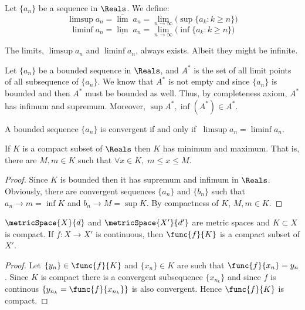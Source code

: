 Let \(\{a_n\}\) be a sequence in \(\Reals\). We define:
\[ \limsup a_n = \overline{\lim} \; a_n = \lim_{n \to \infty}{\Big(\sup{\{a_k : k\geq n\}}\Big)}\]
\[ \liminf a_n = \underline{\lim} \; a_n = \lim_{n \to \infty}{\Big(\inf{\{a_k : k\geq n\}}\Big)}\]

\begin{note}
    The limits, \(\limsup a_n \) and \(\liminf a_n\), always exists. Albeit they might be infinite.
\end{note}

Let \(\{a_n\}\) be a bounded sequence in \(\Reals\), and \(A^*\) is the set of all limit points of all subsequence of  \(\{a_n\}\). We know that \(A^*\) is not empty and since  \(\{a_n\}\) is bounded and then \(A^*\) must be bounded as well. Thus, by completeness axiom, \(A^*\) has infimum and supremum. Moreover, \(\sup{A^*}, \inf(A^*) \in A^*\).

\begin{proposition}
    A bounded sequence \(\{a_n\}\) is convergent if and only if \(\;\limsup a_n = \liminf a_n\).
\end{proposition}

\begin{corollary}
    If \(K\) is a compact subset of \(\Reals\) then \(K\) has minimum and maximum. That is, there are \(M,m \in K\) such that \(\forall x \in K,\; m \leq x \leq M\).
\end{corollary}

\begin{proof}
    Since \(K\) is bounded then it has supremum and infimum in \(\Reals\). Obviously, there are convergent sequences \(\{a_n\}\) and \(\{b_n\}\) such that \(a_n \to m = \inf K\) and \(b_n \to M = \sup K\). By compactness of \(K\), \(M,m \in K\).
\end{proof}

\begin{theorem}
    \(\metricSpace{X}{d}\) and \(\metricSpace{X'}{d'}\) are metric spaces and \(K \subset X\) is compact. If \(f : X \to X'\) is continuous, then \(\func{f}{K}\) is a compact subset of \(X'\).
\end{theorem}

\begin{proof}
    Let \(\{y_n\} \in \func{f}{K}\) and \(\{x_n\} \in K\) are such that \(\func{f}{x_n} = y_n\). Since \(K\) is compact there is a convergent subsequence \(\{x_{n_k}\}\) and since \(f\) is continous \( \{ y_{n_k} = \func{f}{x_{n_k}}\}\) is also convergent. Hence \(\func{f}{K}\) is compact.
\end{proof}


